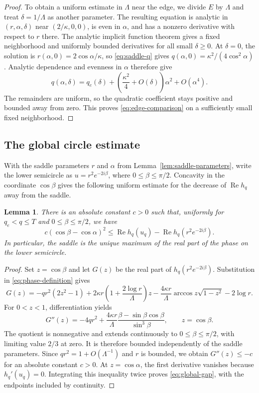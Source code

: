 \documentclass[11pt,reqno]{amsart}
\numberwithin{equation}{section}
\newtheorem{lemma}[theorem]{Lemma}
\renewcommand{\Re}{\operatorname{Re}}
\begin{document}
\begin{proof}
To obtain a uniform estimate in $\Lambda$ near the edge, we divide
$E$ by $\Lambda$ and treat $\delta=1/\Lambda$ as another
parameter. The resulting equation is analytic in
$(r,\alpha,\delta)$ near $(2/\kappa,0,0)$, is even in $\alpha$,
and has a nonzero derivative with respect to $r$ there. The analytic
implicit function theorem gives a fixed neighborhood
and uniformly bounded derivatives for all small $\delta\ge0$.
At $\delta=0$, the solution is $r(\alpha,0)=2\cos\alpha/\kappa$,
so \eqref{eq:saddle-q} gives $q(\alpha,0)=\kappa^2/(4\cos^2\alpha)$.
Analytic dependence and evenness in $\alpha$ therefore give
\begin{equation}\label{eq:edge-Taylor}
 q(\alpha,\delta)=q_e(\delta)
   +\left(\frac{\kappa^2}{4}+O(\delta)\right)\alpha^2
   +O(\alpha^4).
\end{equation}
The remainders are uniform, so the quadratic coefficient stays
positive and bounded away from zero. This proves
\eqref{eq:edge-comparison} on a sufficiently small fixed neighborhood.
\end{proof}

\subsection{The global circle estimate}

With the saddle parameters $r$ and $\alpha$ from
Lemma~\ref{lem:saddle-parameters}, write the lower semicircle as
$u=r^2e^{-2i\beta}$, where $0\le\beta\le\pi/2$.
Concavity in the coordinate $\cos\beta$ gives the following uniform
estimate for the decrease of $\Re h_q$ away from the saddle.

\begin{lemma}\label{lem:circle-gap}
There is an absolute constant $c>0$ such that, uniformly for
$q_e<q\le T$ and $0\le\beta\le\pi/2$, we have
\begin{equation}\label{eq:global-gap}
 c(\cos\beta-\cos\alpha)^2
 \le\Re h_q(u_q)-\Re h_q(r^2e^{-2i\beta}).
\end{equation}
In particular, the saddle is the unique maximum of the real part
of the phase on the lower semicircle.
\end{lemma}

\begin{proof}
Set $z=\cos\beta$ and let $G(z)$ be the real part of
$h_q(r^2e^{-2i\beta})$. Substitution in \eqref{eq:phase-definition}
gives
\[
 G(z)=-qr^2(2z^2-1)
 +2\kappa r\left(1+\frac{2\log r}{\Lambda}\right)z
 -\frac{4\kappa r}{\Lambda}\arccos z\sqrt{1-z^2}-2\log r.
\]
For $0<z<1$, differentiation yields
\[
 G''(z)=-4qr^2+\frac{4\kappa r}{\Lambda}
              \frac{\beta-\sin\beta\cos\beta}{\sin^3\beta},
 \qquad z=\cos\beta.
\]
The quotient is nonnegative and extends continuously to
$0\le\beta\le\pi/2$, with limiting value $2/3$ at zero.
It is therefore bounded independently of the saddle parameters.
Since $qr^2=1+O(\Lambda^{-1})$ and $r$ is bounded, we obtain
$G''(z)\le-c$ for an absolute constant $c>0$. At $z=\cos\alpha$, the first derivative
vanishes because $h_q'(u_q)=0$. Integrating this inequality twice
proves \eqref{eq:global-gap}, with the endpoints included by
continuity.
\end{proof}
\end{document}
